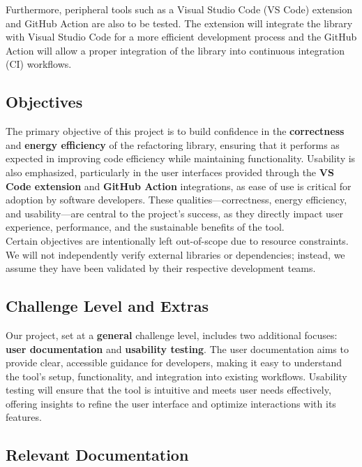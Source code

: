 \documentclass[12pt, titlepage]{article}
\begin{document}
Furthermore, peripheral tools such as a Visual Studio Code (VS Code)
extension and GitHub Action are also to be tested. The extension will
integrate the library with Visual Studio Code for a more efficient
development process and the GitHub Action will allow a proper
integration of the library into continuous integration (CI) workflows.

\subsection{Objectives}

The primary objective of this project is to build confidence in the
\textbf{correctness} and \textbf{energy efficiency} of the
refactoring library, ensuring that it performs as expected in
improving code efficiency while maintaining functionality. Usability
is also emphasized, particularly in the user interfaces provided
through the \textbf{VS Code extension} and \textbf{GitHub Action}
integrations, as ease of use is critical for adoption by software
developers. These qualities—correctness, energy efficiency, and
usability—are central to the project’s success, as they directly
impact user experience, performance, and the sustainable benefits of the tool.\\

Certain objectives are intentionally left out-of-scope due to
resource constraints. We will not independently verify external
libraries or dependencies; instead, we assume they have been
validated by their respective development teams.

\subsection{Challenge Level and Extras}

Our project, set at a \textbf{general} challenge level, includes two
additional focuses: \textbf{user documentation} and \textbf{usability
testing}. The user documentation aims to provide clear, accessible
guidance for developers, making it easy to understand the tool’s
setup, functionality, and integration into existing workflows.
Usability testing will ensure that the tool is intuitive and meets
user needs effectively, offering insights to refine the user
interface and optimize interactions with its features.

\subsection{Relevant Documentation}
\end{document}
